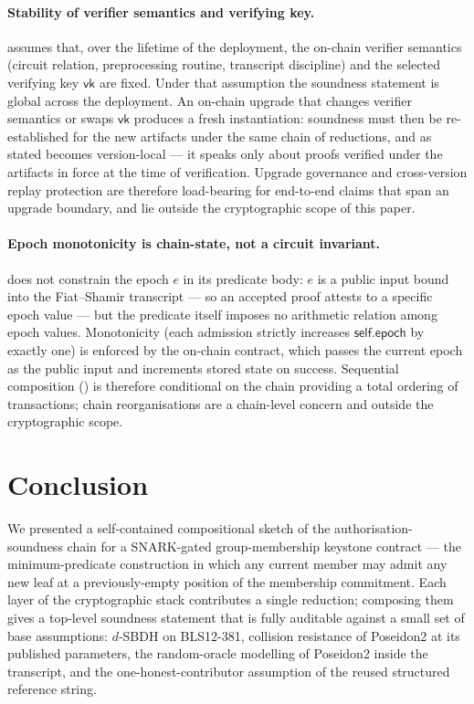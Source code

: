 \documentclass[11pt,a4paper]{article}
\theoremstyle{plain}
\theoremstyle{definition}
\begin{document}
\paragraph{Stability of verifier semantics and verifying key.}
 assumes that, over the lifetime of the
deployment, the on-chain verifier semantics (circuit relation,
preprocessing routine, transcript discipline) and the selected
verifying key $\mathsf{vk}$ are fixed. Under that assumption the
soundness statement is global across the deployment. An on-chain
upgrade that changes verifier semantics or swaps $\mathsf{vk}$
produces a fresh instantiation: soundness must then be
re-established for the new artifacts under the same chain of
reductions, and  as stated becomes version-local
--- it speaks only about proofs verified under the
artifacts in force at the time of verification. Upgrade
governance and cross-version replay protection are therefore
load-bearing for end-to-end claims that span an upgrade
boundary, and lie outside the cryptographic scope of this
paper.

\paragraph{Epoch monotonicity is chain-state, not a circuit
invariant.}  does not constrain the epoch $e$ in
its predicate body: $e$ is a public input bound into the
Fiat--Shamir transcript --- so an accepted proof attests to a
specific epoch value --- but the predicate itself imposes no
arithmetic relation among epoch values. Monotonicity (each
admission strictly increases $\mathsf{self.epoch}$ by exactly one)
is enforced by the on-chain contract, which passes the current
epoch as the public input and increments stored state on success.
Sequential composition () is therefore conditional
on the chain providing a total ordering of transactions; chain
reorganisations are a chain-level concern and outside the
cryptographic scope.

\section{Conclusion}
\label{sec:conclusion}

We presented a self-contained compositional sketch of the
authorisation-soundness chain for a SNARK-gated group-membership
keystone contract --- the minimum-predicate construction in which
any current member may admit any new leaf at a previously-empty
position of the membership commitment. Each layer of the
cryptographic stack contributes a single reduction; composing
them gives a top-level soundness statement that is fully
auditable against a small set of base assumptions: $d$-SBDH on
BLS12-381, collision resistance of Poseidon2 at its published
parameters, the random-oracle modelling of Poseidon2 inside the
transcript, and the one-honest-contributor assumption of the
reused structured reference string.
\end{document}
